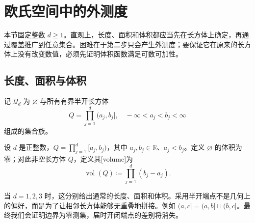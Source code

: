 \section{欧氏空间中的外测度}
\label{b1:sec:0301}

本节固定整数 \(d\geq1\)。直观上，长度、面积和体积都应当先在长方体上确定，再通过覆盖推广到任意集合。困难在于第二步只会产生外测度；要保证它在原来的长方体上没有改变数值，必须先证明体积函数满足可数可加性。

\subsection{长度、面积与体积}
\label{b1:subsec:030101}

记 \(\mathscr Q_d\) 为 \(\varnothing\) 与所有有界半开长方体
\[
Q=\prod_{j=1}^{d}(a_j,b_j],
\quad -\infty<a_j<b_j<\infty
\]
组成的集合族。

\begin{definition}
\label{b1:def:rectangle-volume}
设 \(d\) 是正整数，\(Q=\prod_{j=1}^d[a_j,b_j)\)，其中 \(a_j,b_j\in\mathbb R\)、\(a_j<b_j\)。定义 \(\varnothing\) 的体积为零；对此非空长方体 \(Q\)，定义其[volume]为
\[
\operatorname{vol}(Q)\coloneqq\prod_{j=1}^{d}(b_j-a_j).
\]
\end{definition}

当 \(d=1,2,3\) 时，这分别给出通常的长度、面积和体积。采用半开端点不是几何上的偏好，而是为了让相邻长方体能够无重叠地拼接。例如
\((a,c]=(a,b]\sqcup(b,c]\)。最终我们会证明边界为零测集，届时开闭端点的差别将消失。

